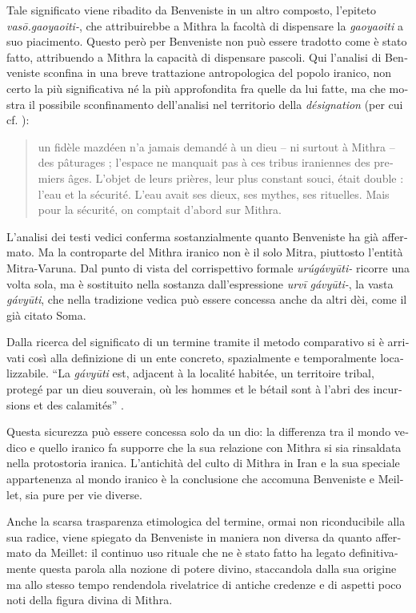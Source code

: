 \documentclass[output=paper]{../langscibook}
\begin{document}
\begin{otherlanguage}{italian}
Tale significato viene ribadito da Benveniste in un altro composto, l’epiteto \textit{vasō.gaoyaoiti-}, che attribuirebbe a Mithra la facoltà di dispensare la \textit{gaoyaoiti} a suo piacimento. Questo però per Benveniste non può essere tradotto come è stato fatto, attribuendo a Mithra la capacità di dispensare pascoli. Qui l’analisi di Benveniste sconfina in una breve trattazione antropologica del popolo iranico, non certo la più significativa né la più approfondita fra quelle da lui fatte, ma che mostra il possibile sconfinamento dell’analisi nel territorio della \textit{désignation} (per cui cf. \citealt[10]{benveniste_vocabulaire_1969}):

\begin{quote}
    un fidèle mazdéen n’a jamais demandé à un dieu – ni surtout à Mithra – des pâturages ; l’espace ne manquait pas à ces tribus iraniennes des premiers âges. L’objet de leurs prières, leur plus constant souci, était double : l’eau et la sécurité. L’eau avait ses dieux, ses mythes, ses rituelles. Mais pour la sécurité, on comptait d’abord sur Mithra. \citep[282]{benveniste_mithra_2015}
\end{quote}

L’analisi dei testi vedici conferma sostanzialmente quanto Benveniste ha già affermato. Ma la controparte del Mithra iranico non è il solo Mitra, piuttosto l’entità Mitra-Varuna. Dal punto di vista del corrispettivo formale \textit{urúgávyūti-} ricorre una volta sola, ma è sostituito nella sostanza dall'espressione \textit{urvī} \textit{gávyūti-}, la vasta \textit{gávyūti}, che nella tradizione vedica può essere concessa anche da altri dèi, come il già citato Soma.

Dalla ricerca del significato di un termine tramite il metodo comparativo si è arrivati così alla definizione di un ente concreto, spazialmente e temporalmente localizzabile. “La \textit{gávyūti} est, adjacent à la localité habitée, un territoire tribal, protegé par un dieu souverain, où les hommes et le bétail sont à l’abri des incursions et des calamités” \citep[284]{benveniste_mithra_2015}.

Questa sicurezza può essere concessa solo da un dio: la differenza tra il mondo vedico e quello iranico fa supporre che la sua relazione con Mithra si sia rinsaldata nella protostoria iranica. L’antichità del culto di Mithra in Iran e la sua speciale appartenenza al mondo iranico è la conclusione che accomuna Benveniste e Meillet, sia pure per vie diverse.

Anche la scarsa trasparenza etimologica del termine, ormai non riconducibile alla sua radice, viene spiegato da Benveniste in maniera non diversa da quanto affermato da Meillet: il continuo uso rituale che ne è stato fatto ha legato definitivamente questa parola alla nozione di potere divino, staccandola dalla sua origine ma allo stesso tempo rendendola rivelatrice di antiche credenze e di aspetti poco noti della figura divina di Mithra.


\end{otherlanguage}
\end{document}
